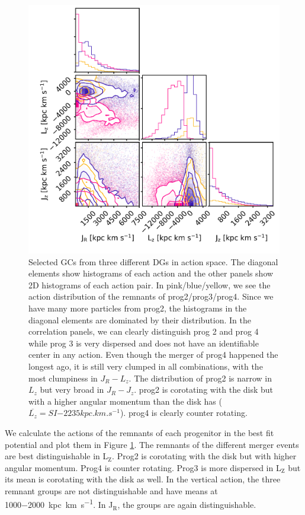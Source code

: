 \begin{figure}[htbp]
\captionsetup{format=plain}
    \centering
    \includegraphics[width=1.0\textwidth]{plots/Dynamics/prog234_GCwodisk_actions_snap_127.png}
    \caption{Selected \acp{GC} from three different \acp{DG} in action space. The diagonal elements show histograms of each action and the other panels show 2D histograms of each action pair. In pink/blue/yellow, we see the action distribution of the remnants of prog2/prog3/prog4. Since we have many more particles from prog2, the histograms in the diagonal elements are dominated by their distribution. In the correlation panels, we can clearly distinguish prog 2 and prog 4 while prog 3 is very dispersed and does not have an identifiable center in any action. Even though the merger of prog4 happened the longest ago, it is still very clumped in all combinations, with the most clumpiness in $J_R - L_z$. The distribution of prog2 is narrow in $L_z$ but very broad in $J_R - J_z$. prog2 is corotating with the disk but with a higher angular momentum than the disk has (\(\overline{L_z} = SI{-2235}{kpc.km.s^{-1}}\)). prog4 is clearly counter rotating.}
    \label{fig:act_all_merg_best_pot}
\end{figure}
We calculate the actions of the remnants of each progenitor in the best fit potential and plot them in Figure \ref{fig:act_all_merg_best_pot}. The remnants of the different merger events are best distinguishable in L$_\mathrm{Z}$. Prog2 is corotating with the disk but with higher angular momentum. Prog4 is counter rotating. Prog3 is more dispersed in L$_\mathrm{Z}$ but its mean is corotating with the disk as well. In the vertical action, the three remnant groups are not distinguishable and have means at \SI{1000-2000}{kpc.km.s^{-1}}. In J$_\mathrm{R}$, the groups are again distinguishable. 
